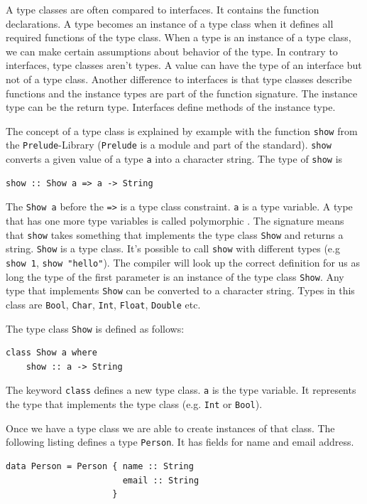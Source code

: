 A type classes are often compared to interfaces. It contains the function declarations. A type becomes an instance of a type class when it defines all required functions of the type class. When a type is an instance of a type class, we can make certain assumptions about behavior of the type. In contrary to interfaces, type classes aren't types. A value can have the type of an interface but not of a type class. Another difference to interfaces is that type classes describe functions and the instance types are part of the function signature. The instance type can be the return type. Interfaces define methods of the instance type.

The concept of a type class is explained by example with the function \verb|show| from the \verb|Prelude|-Library (\verb|Prelude| is a module and part of the standard). \verb|show| converts a given value of a type \verb|a| into a character string. The type of \verb|show| is

\begin{verbatim}
show :: Show a => a -> String
\end{verbatim}

The \verb|Show a| before the \verb|=>| is a type class constraint. \verb|a| is a type variable. A type that has one more type variables is called polymorphic \cite{hutton}. The signature means that \verb|show| takes something that implements the type class \verb|Show| and returns a string. \verb|Show| is a type class. It's possible to call \verb|show| with different types (e.g \verb|show 1|, \verb|show "hello"|). The compiler will look up the correct definition for us as long the type of the first parameter is an instance of the type class \verb|Show|.  
Any type that implements \verb|Show| can be converted to a character string. Types in this class are \verb|Bool|, \verb|Char|, \verb|Int|, \verb|Float|, \verb|Double| etc.

The type class \verb|Show| is defined as follows:
\begin{verbatim}
class Show a where
    show :: a -> String
\end{verbatim}
The keyword \verb|class| defines a new type class. \verb|a| is the type variable. It represents the type that implements the type class (e.g. \verb|Int| or \verb|Bool|).

Once we have a type class we are able to create instances of that class. The following listing defines a type \verb|Person|. It has fields for name and email address. 
\begin{verbatim}
data Person = Person { name :: String
                       email :: String
                     }
\end{verbatim}

